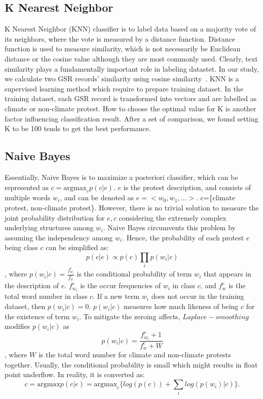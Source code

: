 \subsection{K Nearest Neighbor}
K Nearest Neighbor (KNN) classifier is to label data based on a majority vote of its neighbors, where the vote is measured by a distance function. Distance function is used to measure similarity, which is not necessarily be Euclidean distance or the cosine value although they are most commonly used. Clearly, text similarity plays a fundamentally important role in labeling datastet. In our study, we calculate two GSR records' similarity using cosine similarity~\cite{manning2008introduction}. KNN is a supervised learning method which require to prepare training dataset. In the training dataset, each GSR record is transformed into vectors and are labelled as climate or non-climate protest. How to choose the optimal value for K is another factor influencing classification result. After a set of comparison, we found setting K to be 100 tends to get the best performance.


\subsection{Naive Bayes}
Essentially, Naive Bayes is to maximize a posteriori classifier, which can be represented as $c = \mathrm{argmax}_c{p(c|e)}$. $e$ is the protest description, and consists of multiple words $w_i$, and can be denoted as $e=<w_0, w_1,...>$. c=\{climate protest, non-climate protest\}. However, there is no trivial solution to measure the joint probability distribution for $e,c$ considering the extremely complex underlying structures among $w_i$. Naive Bayes circumvents this problem by assuming the independency among $w_i$. Hence, the probability of each protest $e$ being class $c$ can be simplified as: $$p(c|e)\propto p(c)\prod_i p(w_i|c)$$, where $p(w_i|c)=\frac{f_{w_i}^c}{f_{w}^c}$ is the conditional probability of term $w_i$ that appears in the description of $e$. $f_{w_i}^c$ is the occur frequencies of $w_i$ in class $c$, and $f_{w}^c$ is the total word number in class $c$.  If a new term $w_i$ does not occur in the training dataset, then $p(w_i|c) = 0$. $p(w_i|c)$ measures how much likeness of being $c$ for the existence of term $w_i$. To mitigate the zeroing affects, $Laplace-smoothing$ modifies $p(w_i|c)$ as $$p(w_i|c)=\frac{f_{w_i}^c+1}{f_{w}^c+W}$$, where $W$ is the total word number for climate and non-climate protests together. Usually, the conditional probability is small which might results in float point underflow. In reality, it is converted as: $$c = \mathrm{argmax}{p(c|e)}=\mathrm{argmax}_c\{log(p(c)) + \sum_ilog(p(w_i)|c)\}.$$


